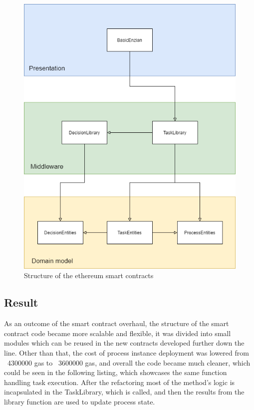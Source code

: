 \begin{figure}[h]
	\includegraphics[width=\textwidth]{gfx/eth-contracts}
	\caption{Structure of the ethereum smart contracts}
	\label{fig:impr:eth:contracts}
\end{figure}

\subsection{Result}
\label{sec:impr:eth:result}

As an outcome of the smart contract overhaul, the structure of the smart contract code became more scalable and flexible, it was divided into small modules which can be reused in the new contracts developed further down the line.
Other than that, the cost of process instance deployment was lowered from ~4300000 gas to ~3600000 gas, and overall the code became much cleaner, which could be seen in the following listing, which showcases the same function handling task execution. After the refactoring most of the method's logic is incapsulated in the TaskLibrary, which is called, and then the results from the library function are used to update process state.

 

